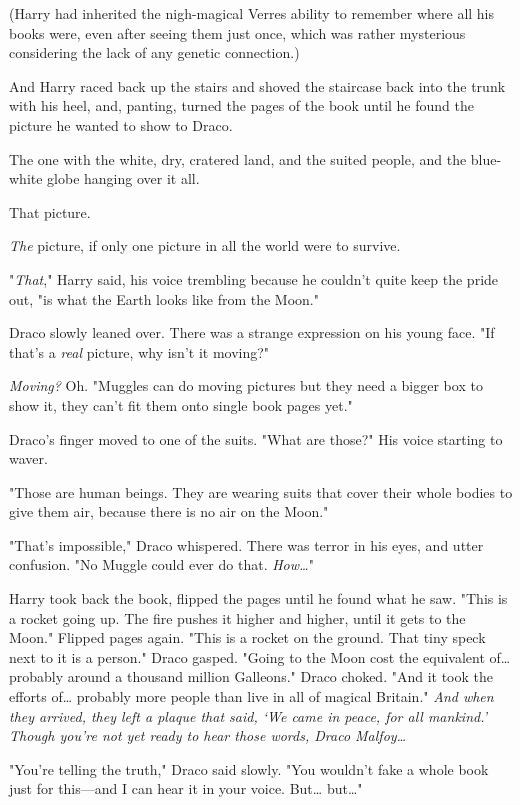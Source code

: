 (Harry had inherited the nigh-magical Verres ability to remember where all his 
books were, even after seeing them just once, which was rather mysterious 
considering the lack of any genetic connection.)

And Harry raced back up the stairs and shoved the staircase back into the trunk 
with his heel, and, panting, turned the pages of the book until he found the 
picture he wanted to show to Draco.

The one with the white, dry, cratered land, and the suited people, and the 
blue-white globe hanging over it all.

That picture.

\emph{The} picture, if only one picture in all the world were to survive.

"\emph{That}," Harry said, his voice trembling because he couldn't quite keep 
the pride out, "is what the Earth looks like from the Moon."

Draco slowly leaned over. There was a strange expression on his young face. "If 
that's a \emph{real} picture, why isn't it moving?"

\emph{Moving?} Oh. "Muggles can do moving pictures but they need a bigger box 
to show it, they can't fit them onto single book pages yet."

Draco's finger moved to one of the suits. "What are those?" His voice starting 
to waver.

"Those are human beings. They are wearing suits that cover their whole bodies 
to give them air, because there is no air on the Moon."

"That's impossible," Draco whispered. There was terror in his eyes, and utter 
confusion. "No Muggle could ever do that. \emph{How{\ldots}}"

Harry took back the book, flipped the pages until he found what he saw. "This 
is a rocket going up. The fire pushes it higher and higher, until it gets to 
the Moon." Flipped pages again. "This is a rocket on the ground. That tiny 
speck next to it is a person." Draco gasped. "Going to the Moon cost the 
equivalent of{\ldots} probably around a thousand million Galleons." Draco 
choked. "And it took the efforts of{\ldots} probably more people than live in 
all of magical Britain." \emph{And when they arrived, they left a plaque that 
said, `We came in peace, for all mankind.' Though you're not yet ready to hear 
those words, Draco Malfoy{\ldots}}

"You're telling the truth," Draco said slowly. "You wouldn't fake a whole book 
just for this---and I can hear it in your voice. But{\ldots} but{\ldots}"

